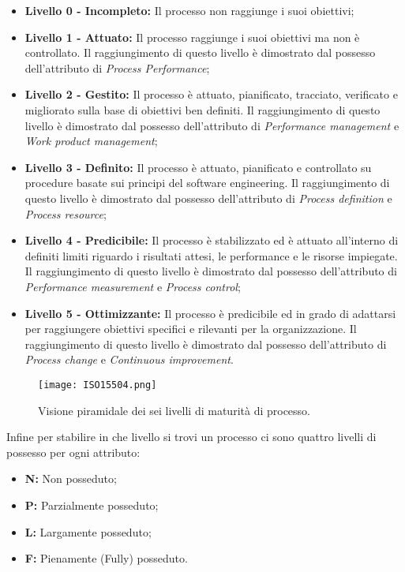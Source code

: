 \documentclass{scalatekids-article}
\begin{document}
\begin{itemize}
  \item{\textbf{Livello 0 - Incompleto:} Il processo non raggiunge i suoi obiettivi;}
  \item{\textbf{Livello 1 - Attuato:} Il processo raggiunge i suoi obiettivi ma non è controllato. Il raggiungimento di questo livello è dimostrato dal possesso dell'attributo di \textit{Process Performance};}
  \item{\textbf{Livello 2 - Gestito:} Il processo è attuato, pianificato, tracciato, verificato e migliorato sulla base di obiettivi ben definiti. Il raggiungimento di questo livello è dimostrato dal possesso dell'attributo di \textit{Performance management} e \textit{Work product management};}
  \item{\textbf{Livello 3 - Definito:} Il processo è attuato, pianificato e controllato su procedure basate sui principi del software engineering. Il raggiungimento di questo livello è dimostrato dal possesso dell'attributo di \textit{Process definition} e \textit{Process resource};}
  \item{\textbf{Livello 4 - Predicibile:} Il processo è stabilizzato ed è attuato all’interno di definiti limiti riguardo i risultati attesi, le performance e le risorse impiegate. Il raggiungimento di questo livello è dimostrato dal possesso dell'attributo di \textit{Performance measurement} e \textit{Process control};}
  \item{\textbf{Livello 5 - Ottimizzante:} Il processo è predicibile ed in grado di adattarsi per raggiungere obiettivi specifici e rilevanti per la organizzazione. Il raggiungimento di questo livello è dimostrato dal possesso dell'attributo di \textit{Process change} e \textit{Continuous improvement}.}
\end{itemize}
\begin{figure}[H]
  \begin{center}
    \texttt{[image: ISO15504.png]}
    \caption{Visione piramidale dei sei livelli di maturità di processo.}
  \end{center}
\end{figure}
Infine per stabilire in che livello si trovi un processo ci sono quattro livelli di possesso per ogni attributo:
\begin{itemize}
  \item{\textbf{N:} Non posseduto;}
  \item{\textbf{P:} Parzialmente posseduto;}
  \item{\textbf{L:} Largamente posseduto;}
  \item{\textbf{F:} Pienamente (Fully) posseduto.}
\end{itemize}
\end{document}
